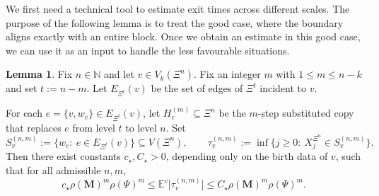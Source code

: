 \documentclass{article}
\theoremstyle{plain}
\theoremstyle{definition}
\newtheorem{lemma}[theorem]{Lemma}
\begin{document}
We first need a technical tool to estimate exit times across different scales.
The purpose of the following lemma is to treat the good case, where the boundary aligns exactly with an entire block.
Once we obtain an estimate in this good case, we can use it as an input to handle the less favourable situations.

\begin{lemma}\label{lem:star_domain_exit_time_scale}
Fix $n\in\mathbb N$ and let $v\in V_k(\Xi^n)$.
Fix an integer $m$ with $1\le m\le n-k$ and set $t:=n-m$.
Let $E_{\Xi^{t}}(v)$ be the set of edges of $\Xi^{t}$ incident to $v$.

For each $e=\{v,w_e\}\in E_{\Xi^{t}}(v)$, let $H_e^{(m)}\subseteq \Xi^n$ be the $m$-step substituted copy that replaces $e$ from level $t$ to level $n$.
Set
\[
S_{v}^{(n,m)}:=\{w_e:\ e\in E_{\Xi^{t}}(v)\}\subseteq V(\Xi^n),
\qquad
\tau_{v}^{(n,m)}:=\inf\{j\ge 0:\ X_j^{\Xi^n}\in S_{v}^{(n,m)}\}.
\]
Then there exist constants $c_{\star},C_{\star}>0$, depending only on the birth data of $v$, such that for all admissible $n,m$,
\[
c_{\star} \rho(\mathbf M)^m\rho(\Psi)^m
\le
\mathbb E^v\big[\tau_{v}^{(n,m)}\big]
\le
C_{\star} \rho(\mathbf M)^m\rho(\Psi)^m.
\]
\end{lemma}
\end{document}
